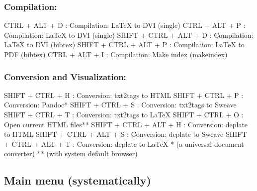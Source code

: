 \subsubsection{Compilation:}

\vspace{-0.5cm}
\begin{Rtables}[caption={[Compilation keyboard shortcuts]
    Compilation keyboard shortcuts},
  label=hotkey:compilation]
  CTRL  + ALT  + D       : Compilation: LaTeX to DVI (single)
  CTRL  + ALT  + P       : Compilation: LaTeX to DVI (single)
  SHIFT + CTRL + ALT + D : Compilation: LaTeX to DVI (bibtex)
  SHIFT + CTRL + ALT + P : Compilation: LaTeX to PDF (bibtex)
  CTRL  + ALT  + I       : Compilation: Make index (makeindex)
\end{Rtables}


\subsubsection{Conversion and Visualization:}

\vspace{-0.5cm}
\begin{Rtables}[caption={[Conversion and visualization keyboard shortcuts]
    Conversion and visualization keyboard shortcuts},
  label=hotkey:conversion]
  SHIFT + CTRL + H       : Conversion: txt2tags to HTML
  SHIFT + CTRL + P       : Conversion: Pandoc*
  SHIFT + CTRL + S       : Conversion: txt2tags to Sweave
  SHIFT + CTRL + T       : Conversion: txt2tags to LaTeX
  SHIFT + CTRL + O       : Open current HTML files**
  SHIFT + CTRL + ALT + H : Conversion: deplate to HTML
  SHIFT + CTRL + ALT + S : Conversion: deplate to Sweave
  SHIFT + CTRL + ALT + T : Conversion: deplate to LaTeX
  *  (a universal document converter)
  ** (with system default browser)
\end{Rtables}


\newpage
\hypertarget{basic_card_mainmenu}{}
\subsection{Main menu (systematically)}

